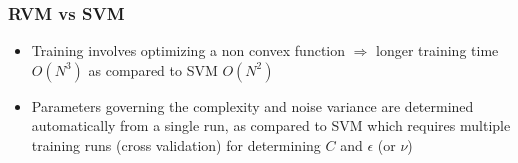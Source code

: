 \documentclass[t,14pt]{beamer}
\begin{document}
\begin{frame}
  \frametitle{RVM vs SVM}
  \begin{itemize}
    \item {
            Training involves optimizing a non convex function 
            $\Rightarrow$ 
            longer training time $O(N^3)$ as compared to SVM $O(N^2)$
          }
    \item {
            Parameters governing the complexity and noise variance are 
            determined automatically from a single run, as compared to SVM 
            which requires multiple training runs (cross validation) for 
            determining $C$ and $\epsilon$ (or $\nu$)
          }
  \end{itemize}
\end{frame}
\end{document}
